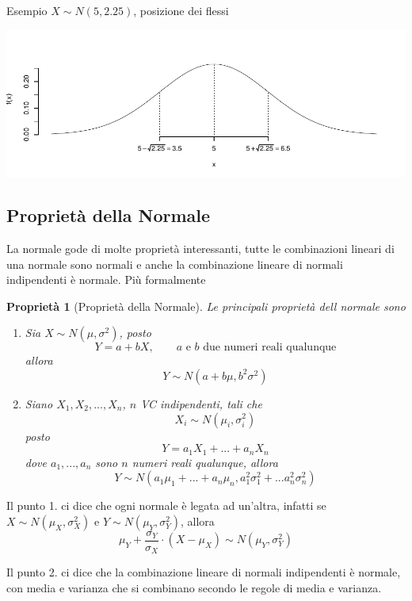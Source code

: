 \documentclass[
  11pt,
]{book}
\providecommand{\tightlist}{%
  \setlength{\itemsep}{0pt}\setlength{\parskip}{0pt}}
\theoremstyle{mytheoremstyle}
\newtheorem{proposition}{Proprietà}[section]
\theoremstyle{mydefstyle}
\begin{document}
Esempio \(X\sim N(5,2.25)\), posizione dei flessi

\begin{center}\includegraphics{Appunti_di_Statistica_2025_files/figure-latex/07c-Normale-4-1} \end{center}

\subsection{Proprietà della Normale}\label{proprietuxe0-della-normale}

La normale gode di molte proprietà interessanti, tutte le combinazioni lineari di
una normale sono normali e anche la combinazione lineare di normali indipendenti
è normale. Più formalmente

\begin{proposition}[Proprietà della Normale]

Le principali proprietà dell normale sono

\begin{enumerate}
\def\labelenumi{\arabic{enumi}.}
\tightlist
\item
  Sia \(X\sim N(\mu,\sigma^2)\), posto
  \[Y=a+bX,\qquad\text{$a$ e $b$ due numeri reali qualunque}\]
  allora
  \[Y\sim N(a+b\mu,b^2\sigma^2)\]
\item
  Siano \(X_1, X_2,...,X_n\), \(n\) VC indipendenti, tali che
  \[X_i\sim N(\mu_i,\sigma_i^2)\]
  posto
  \[Y=a_1X_1+...+a_nX_n\]
  dove \(a_1,...,a_n\) sono \(n\) numeri reali qualunque, allora
  \[Y\sim N(a_1\mu_1+...+a_n\mu_n,a_1^2\sigma_1^2+...a_n^2\sigma_n^2)\]
\end{enumerate}

\end{proposition}

Il punto 1. ci dice che ogni normale è legata ad un'altra, infatti se \(X\sim N(\mu_X,\sigma_X^2)\) e \(Y\sim N(\mu_Y,\sigma_Y^2)\), allora
\[
\mu_Y+\frac{\sigma_Y}{\sigma_X}\cdot (X-\mu_X)\sim N(\mu_Y,\sigma_Y^2)
\]

Il punto 2. ci dice che la combinazione lineare di normali indipendenti è normale,
con media e varianza che si combinano secondo le regole di media e varianza.
\end{document}
